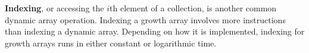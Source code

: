 \textbf{Indexing}, or accessing the $i$th element of a collection, is another common dynamic array operation. Indexing a growth array involves more instructions than indexing a dynamic array. Depending on how it is implemented, indexing for growth arrays runs in either constant or logarithmic time.